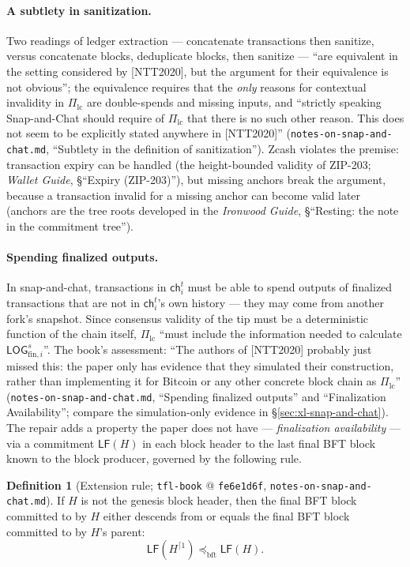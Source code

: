 \documentclass[11pt,a4paper]{article}
\theoremstyle{definition}
\newtheorem{definition}[theorem]{Definition}
\begin{document}
\paragraph{A subtlety in sanitization.} Two readings of ledger extraction
--- concatenate transactions then sanitize, versus concatenate blocks,
deduplicate blocks, then sanitize --- ``are equivalent in the setting
considered by [NTT2020], but the argument for their equivalence is not
obvious''; the equivalence requires that the \emph{only} reasons for
contextual invalidity in $\Pi_{\mathrm{lc}}$ are double-spends and missing
inputs, and ``strictly speaking Snap-and-Chat should require of
$\Pi_{\mathrm{lc}}$ that there is no such other reason. This does not seem
to be explicitly stated anywhere in [NTT2020]''
(\texttt{notes-on-snap-and-chat.md}, ``Subtlety in the definition of
sanitization''). Zcash violates the premise: transaction expiry can be
handled (the height-bounded validity of ZIP-203; \emph{Wallet Guide},
\S``Expiry (ZIP-203)''), but missing anchors break the argument, because
a transaction invalid for a missing anchor can become valid later
(anchors are the tree roots developed in the \emph{Ironwood Guide},
\S``Resting: the note in the commitment tree'').

\paragraph{Spending finalized outputs.} In snap-and-chat, transactions in
$\mathsf{ch}_i^t$ must be able to spend outputs of finalized transactions
that are not in $\mathsf{ch}_i^t$'s own history --- they may come from
another fork's snapshot. Since consensus validity of the tip must be a
deterministic function of the chain itself, $\Pi_{\mathrm{lc}}$ ``must
include the information needed to calculate
$\mathsf{LOG}_{\mathrm{fin},i}^s$''. The book's assessment: ``The authors
of [NTT2020] probably just missed this: the paper only has evidence that
they simulated their construction, rather than implementing it for
Bitcoin or any other concrete block chain as $\Pi_{\mathrm{lc}}$''
(\texttt{notes-on-snap-and-chat.md}, ``Spending finalized outputs'' and
``Finalization Availability''; compare the simulation-only evidence in
\S\ref{sec:xl-snap-and-chat}). The repair adds a property the paper does
not have --- \emph{finalization availability} --- via a commitment
$\mathsf{LF}(H)$ in each block header to the last final BFT block known to
the block producer, governed by the following rule.

\begin{definition}[Extension rule; \texttt{tfl-book} @ \texttt{fe6e1d6f},
\texttt{notes-on-snap-and-chat.md}]\label{def:xl-extension}
If $H$ is not the genesis block header, then the final BFT block committed
to by $H$ either descends from or equals the final BFT block committed to
by $H$'s parent:
\[
\mathsf{LF}(H^{\lceil 1}) \preceq_{\mathrm{bft}} \mathsf{LF}(H).
\]
\end{definition}
\end{document}
